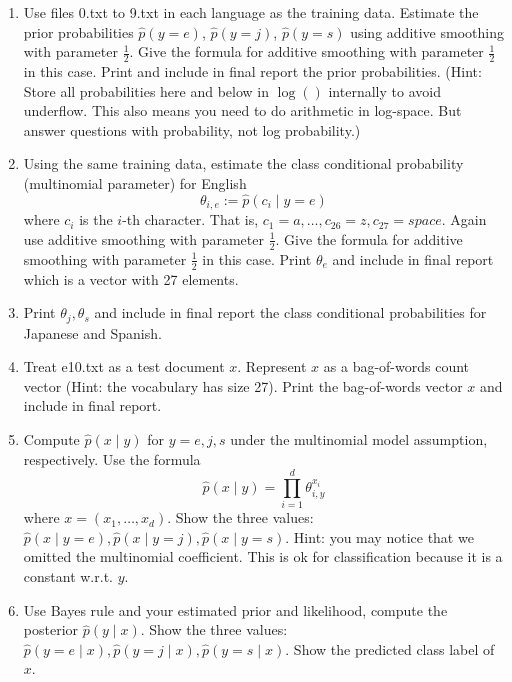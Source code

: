 \documentclass[a4paper]{article}
\theoremstyle{definition}
\begin{document}
\begin{enumerate}
	\item
	      Use files 0.txt to 9.txt in each language as the training data.
	      Estimate the prior probabilities
	      $\hat p(y=e)$,
	      $\hat p(y=j)$,
	      $\hat p(y=s)$
	      using additive smoothing with parameter $\frac{1}{2}$.
	      Give the formula for additive smoothing with parameter $\frac{1}{2}$ in this case.
	      Print and include in final report the prior probabilities.
	      (Hint: Store all probabilities here and below in $\log()$ internally to avoid underflow. This also means you need to do arithmetic in log-space.  But answer questions with probability, not log probability.)


	\item
	      Using the same training data, estimate the class conditional probability (multinomial parameter) for English
	      $$\theta_{i,e} := \hat p(c_i \mid y=e)$$
	      where $c_i$ is the $i$-th character. That is, $c_1 = a, \ldots, c_{26} = z, c_{27} = space$.
	      Again use additive smoothing with parameter $\frac{1}{2}$.
	      Give the formula for additive smoothing with parameter $\frac{1}{2}$ in this case.
	      Print $\theta_e$ and include in final report which is a vector with 27 elements.


	\item
	      Print $\theta_j, \theta_s$ and include in final report the class conditional probabilities for Japanese and Spanish.

	\item
	      Treat e10.txt as a test document $x$.
	      Represent $x$ as a bag-of-words count vector (Hint: the vocabulary has size 27).
	      Print the bag-of-words vector $x$ and include in final report.

	\item
	      Compute $\hat p(x \mid y)$ for $y=e, j, s$ under the multinomial model assumption, respectively.
	      Use the formula
	      $$\hat p(x \mid y) = \prod_{i=1}^d \theta_{i, y}^{x_i}$$
	      where $x=(x_1, \ldots, x_d)$.
	      Show the three values: $\hat p(x \mid y=e), \hat p(x \mid y=j), \hat p(x \mid y=s)$.
	      Hint: you may notice that we omitted the multinomial coefficient.  This is ok for classification because it is a constant w.r.t. $y$.


	\item
	      Use Bayes rule and your estimated prior and likelihood, compute the posterior $\hat p(y \mid x)$.
	      Show the three values: $\hat p(y=e \mid x), \hat p(y=j \mid x), \hat p(y=s \mid x)$.
	      Show the predicted class label of $x$.



\end{enumerate}
\end{document}

